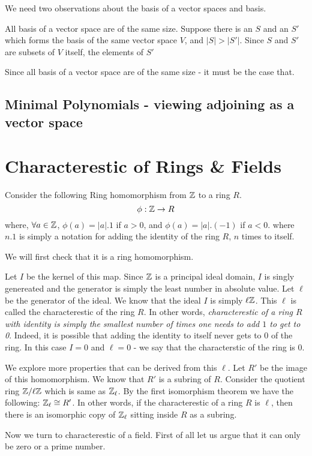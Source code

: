 We need two observations about the basis of a vector spaces and basis. 

All basis of a vector space are of the same size. Suppose there is an $S$ and an $S'$ which forms the basis of the same vector space $V$, and $|S| > |S'|$. Since $S$ and $S'$ are subsets of $V$ itself, the elements of $S'$ 

Since all basis of a vector space are of the same size - it must be the case that.
\subsection{Minimal Polynomials - viewing adjoining as a vector space}

\section{Characterestic of Rings \& Fields}

Consider the following Ring homomorphism from ${\mathbb{Z}}$ to a ring $R$.
\[ \phi : {\mathbb{Z}} \to R \]
where, $\forall a \in {\mathbb{Z}}$, $\phi(a) = |a|.1$ if $a > 0$, and $\phi(a) = |a|.(-1)$ if $a < 0$. where $n.1$ is simply a notation for adding the identity of the ring $R$, $n$ times to itself.

We will first check that it is a ring homomorphism. 

Let $I$ be the kernel of this map. Since ${\mathbb{Z}}$ is a principal ideal domain, $I$ is singly genereated and the generator is simply the least number in absolute value. Let $\ell$ be the generator of the ideal. We know that the ideal $I$ is simply $\ell {\mathbb{Z}}$. This $\ell$ is called the characterestic of the ring $R$. In other words, {\em characterestic of a ring $R$ with identity is simply the smallest number of times one needs to add $1$ to get to 0}. Indeed, it is possible that adding the identity to itself never gets to $0$ of the ring. In this case $I = {0}$ and $\ell=0$ - we say that the characterstic of the ring is $0$.

We explore more properties that can be derived from this $\ell$. 
Let $R'$ be the image of this homomorphism. We know that $R'$ is a subring of $R$. Consider the quotient ring ${\mathbb{Z}}/\ell{\mathbb{Z}}$ which is same as ${\mathbb{Z}}_\ell$. By the first isomorphism theorem we have the following:
${\mathbb{Z}}_\ell \cong R'$. In other words, if the characterestic of a ring $R$ is $\ell$, then there is an isomorphic copy of ${\mathbb{Z}}_\ell$ sitting inside $R$ as a subring.

Now we turn to characterestic of a field. First of all let us argue that it can only be zero or a prime number.

